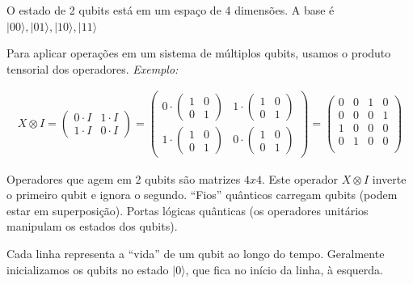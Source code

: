 \documentclass[12pt, a4paper]{article}
\newcommand{\ket}[1]{\lvert #1 \rangle}
\begin{document}
O estado de 2 qubits está em um espaço de 4 dimensões. A base é \(\ket{00}, \ket{01}, \ket{10}, \ket{11}\)

Para aplicar operações em um sistema de múltiplos qubits, usamos o produto tensorial dos operadores. \textit{Exemplo:}

\begin{align}
    X \otimes I = \begin{pmatrix}
        0 \cdot I & 1 \cdot I \\
        1 \cdot I & 0 \cdot I
    \end{pmatrix} = 
    \begin{pmatrix}
        0 \cdot \begin{pmatrix}
            1 & 0 \\
            0 & 1 
        \end{pmatrix} 
        & 1 \cdot \begin{pmatrix}
            1 & 0 \\
            0 & 1 
        \end{pmatrix} \\
        1\cdot \begin{pmatrix}
            1 & 0 \\
            0 & 1 
        \end{pmatrix} 
        & 0 \cdot \begin{pmatrix}
            1 & 0 \\
            0 & 1 
        \end{pmatrix}
    \end{pmatrix} = 
    \begin{pmatrix}
        0 & 0 & 1 & 0 \\
        0 & 0 & 0 & 1 \\
        1 & 0 & 0 & 0 \\
        0 & 1 & 0 & 0 \\
    \end{pmatrix}
\end{align}

Operadores que agem em 2 qubits são matrizes $4x4$. Este operador $X\otimes I$ inverte o primeiro qubit e ignora o segundo. ``Fios'' quânticos carregam qubits (podem estar em superposição). Portas lógicas quânticas (os operadores unitários manipulam os estados dos qubits). 

Cada linha representa a ``vida'' de um qubit ao longo do tempo. Geralmente inicializamos os qubits no estado $\ket{0}$, que fica no início da linha, à esquerda.
\end{document}

